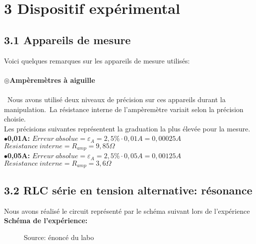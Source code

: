 \documentclass{report}
\begin{document}
\section*{3 Dispositif exp\'erimental}

\subsection*{3.1 Appareils de mesure}

Voici quelques remarques sur les appareils de mesure utilis\'es: \\ ~~\\
\textbf{$\circledcirc$Amp\`erem\`etres \`a aiguille} \\ ~~\\
\hspace*{0,5cm}\ Nous avons utilis\'e deux niveaux de pr\'ecision sur ces appareils durant la manipulation.\ La r\'esistance interne de l'amp\`erem\`etre variait selon la pr\'ecision choisie. \\
\hspace*{0,59cm} Les pr\'ecisions suivantes repr\'esentent la graduation la plus \'elev\'ee pour la mesure. \\

\textbf{$\bullet$0,01A:} $Erreur\ absolue = \varepsilon_{A} = 2,5\% \cdot 0,01A = 0,00025A$ \\
\hspace*{1,82cm} $Resistance\ interne = R_{amp} = 9,85\Omega $ \\

\textbf{$\bullet$0,05A:} $Erreur\ absolue = \varepsilon_{A} = 2,5\% \cdot 0,05A = 0,00125A$ \\
\hspace*{1,82cm} $Resistance\ interne = R_{amp} = 3,6\Omega $


\subsection*{3.2 RLC s\'erie en tension alternative: r\'esonance}

Nous avons r\'ealis\'e le circuit repr\'esent\'e par le sch\'ema suivant lors de l'exp\'erience \\

\textbf{Sch\'ema de l'exp\'erience: }

\begin{figure}[h!]
\centering
\caption{Source: \'enonc\'e du labo}
\end{figure}
\end{document}
